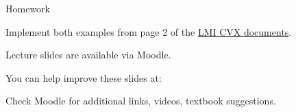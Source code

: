 \documentclass{beamer}
\begin{document}
%
%
%
%



\begin{frame}{Homework}
\begin{flushleft}


Implement both examples from page 2 of the \href{http://stanford.edu/class/ee363/notes/lmi-cvx.pdf}{LMI CVX documents}.

\end{flushleft}
\end{frame}





\begin{frame}
	\centerline{Lecture slides are available via Moodle.}
	\bigskip
	\centerline{You can help improve these slides at:}
	\centerline{
		\mygit
	}
	\bigskip
	
	\textcolor{black}{}
	\bigskip
	
	
	\centerline{Check Moodle for additional links, videos, textbook suggestions.}
\end{frame}
\end{document}
